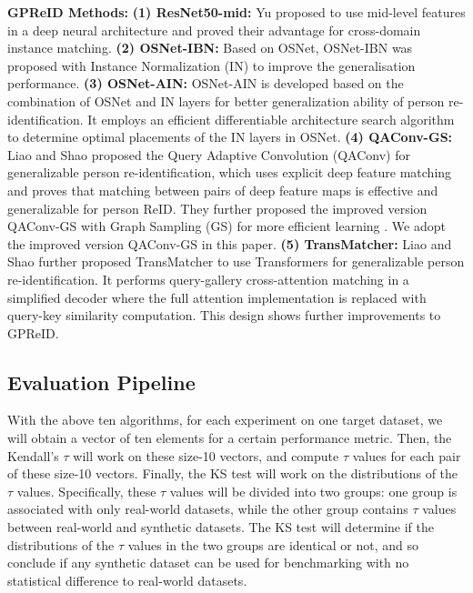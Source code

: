 \documentclass[10pt,twocolumn,letterpaper]{article}
\begin{document}
\textbf{GPReID Methods:}
\textbf{(1) ResNet50-mid:} Yu \etal \cite{yu2017devil} proposed to use mid-level features in a deep neural architecture and proved their advantage for cross-domain instance matching. 
\textbf{(2) OSNet-IBN:} Based on OSNet, OSNet-IBN \cite{Zhou2019-OSNet} was proposed with Instance Normalization (IN) \cite{pan2018two} to improve the generalisation performance.
\textbf{(3) OSNet-AIN:} OSNet-AIN \cite{zhou2021osnet} is developed based on the combination of OSNet and IN layers for better generalization ability of person re-identification. It employs an efficient differentiable architecture search algorithm to determine optimal placements of the IN layers in OSNet.
\textbf{(4) QAConv-GS:} Liao and Shao \cite{liao2020interpretable} proposed the Query Adaptive Convolution (QAConv) for generalizable person re-identification, which uses explicit deep feature matching and proves that matching between pairs of deep feature maps is effective and generalizable for person ReID. They further proposed the improved version QAConv-GS with Graph Sampling (GS) for more efficient learning \cite{Liao-2021-QAConv-GS}. We adopt the improved version QAConv-GS in this paper.
\textbf{(5) TransMatcher:} Liao and Shao \cite{liao2021transmatcher} further proposed TransMatcher to use Transformers for generalizable person re-identification. It performs query-gallery cross-attention matching in a simplified decoder where the full attention implementation is replaced with query-key similarity computation. This design shows further improvements to GPReID.

\subsection{Evaluation Pipeline}
With the above ten algorithms, for each experiment on one target dataset, we will obtain a vector of ten elements for a certain performance metric. Then, the Kendall's $\tau$ will work on these size-10 vectors, and compute $\tau$ values for each pair of these size-10 vectors. Finally, the KS test will work on the distributions of the $\tau$ values. Specifically, these $\tau$ values will be divided into two groups: one group is associated with only real-world datasets, while the other group contains $\tau$ values between real-world and synthetic datasets. The KS test will determine if the distributions of the $\tau$ values in the two groups are identical or not, and so conclude if any synthetic dataset can be used for benchmarking with no statistical difference to real-world datasets.
\end{document}
